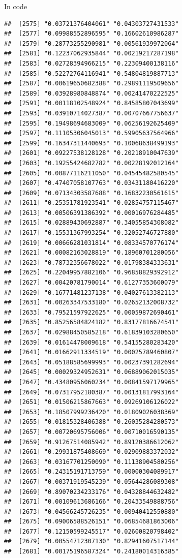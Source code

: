 \documentclass[ignorenonframetext,]{beamer}
\begin{document}
\begin{frame}[fragile]{In code}
\begin{verbatim}
##  [2575] "0.03721376404061" "0.04303727431533"
##  [2577] "0.09988552896595" "0.16602610986287"
##  [2579] "0.28773255290981" "0.00561939972064"
##  [2581] "0.12237062935844" "0.00219217287198"
##  [2583] "0.02728394966215" "0.22309400138116"
##  [2585] "0.52272764116941" "0.54804819887713"
##  [2587] "0.00619650682388" "0.29891119509656"
##  [2589] "0.03928980848874" "0.00241470222525"
##  [2591] "0.00118102548924" "0.84585807043699"
##  [2593] "0.03910714027387" "0.00707667756637"
##  [2595] "0.19498694683009" "0.06256192625409"
##  [2597] "0.11105306045013" "0.59905637564966"
##  [2599] "0.16347311440693" "0.10068638499193"
##  [2601] "0.09227538128128" "0.20218910047639"
##  [2603] "0.19255424682782" "0.00228192012164"
##  [2605] "0.00877116211050" "0.04545482580545"
##  [2607] "0.47407058107763" "0.03431180416220"
##  [2609] "0.07134303587688" "0.16832230561615"
##  [2611] "0.25351781923541" "0.02854757115467"
##  [2613] "0.00506391386392" "0.00016976284485"
##  [2615] "0.02889430692887" "0.34055854308082"
##  [2617] "0.15531367993254" "0.32052746727880"
##  [2619] "0.00666281031814" "0.08334570776174"
##  [2621] "0.00082163028819" "0.18960701280056"
##  [2623] "0.78732356678022" "0.01798384333631"
##  [2625] "0.22049957882106" "0.96858829392912"
##  [2627] "0.00420781790014" "0.61277353600079"
##  [2629] "0.16771481237138" "0.04027613382113"
##  [2631] "0.00263347533180" "0.02652132008732"
##  [2633] "0.79521597922625" "0.00059872690461"
##  [2635] "0.85256584824182" "0.83177816674541"
##  [2637] "0.02988450585218" "0.61839103280650"
##  [2639] "0.01614478009618" "0.54155280283420"
##  [2641] "0.01662911334519" "0.00025789460807"
##  [2643] "0.05188585699993" "0.00237391282694"
##  [2645] "0.00029324952631" "0.06889062015035"
##  [2647] "0.43480956060234" "0.00841597179965"
##  [2649] "0.07317952180387" "0.00131817993164"
##  [2651] "0.01506215867663" "0.09269106126022"
##  [2653] "0.18507999236420" "0.01809026038369"
##  [2655] "0.01815328406388" "0.26035284280573"
##  [2657] "0.00720695756006" "0.00710016590135"
##  [2659] "0.91267514085942" "0.89120386612062"
##  [2661] "0.29931875408669" "0.02909883372032"
##  [2663] "0.03167701250090" "0.11138904580256"
##  [2665] "0.24315191713759" "0.00000304089917"
##  [2667] "0.00371919545239" "0.05644286089308"
##  [2669] "0.89070234233176" "0.04328844632482"
##  [2671] "0.00109613686166" "0.20433549888756"
##  [2673] "0.04566245726235" "0.00940412550880"
##  [2675] "0.09006588526151" "0.06854681863006"
##  [2677] "0.12150599245517" "0.02600820798402"
##  [2679] "0.00554712307130" "0.82941607517144"
##  [2681] "0.00175196587324" "0.24180014316385"

\end{verbatim}
\end{frame}
\end{document}
